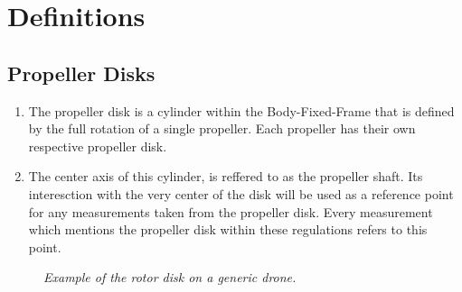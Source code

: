 \documentclass{article}
\begin{document}
\newpage
\section{Definitions}
\subsection{Propeller Disks}
\begin{enumerate}
  \item The propeller disk is a cylinder within the Body-Fixed-Frame that is defined by the full rotation of a single propeller. Each propeller has their own respective propeller disk. 
  \item The center axis of this cylinder, is reffered to as the propeller shaft. Its interesction with the very center of the disk will be used as a reference point for any measurements taken from the propeller disk. Every measurement which mentions the propeller disk within these regulations refers to this point.
\end{enumerate}

\begin{figure}[h!]
  \centering
 \caption{\textit{Example of the rotor disk on a generic drone.}}
 \end{figure}
\end{document}
